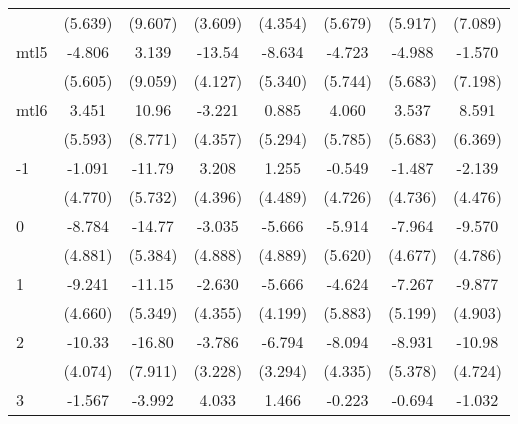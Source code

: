 \documentclass{article}
\begin{document}
{\begin{longtable}{l*{7}{c}}
                &  (5.639)         &  (9.607)         &  (3.609)         &  (4.354)         &  (5.679)         &  (5.917)         &  (7.089)         \\
mtl5            &   -4.806         &    3.139         &   -13.54\sym{**} &   -8.634         &   -4.723         &   -4.988         &   -1.570         \\
                &  (5.605)         &  (9.059)         &  (4.127)         &  (5.340)         &  (5.744)         &  (5.683)         &  (7.198)         \\
mtl6            &    3.451         &    10.96         &   -3.221         &    0.885         &    4.060         &    3.537         &    8.591         \\
                &  (5.593)         &  (8.771)         &  (4.357)         &  (5.294)         &  (5.785)         &  (5.683)         &  (6.369)         \\
-1              &   -1.091         &   -11.79\sym{*}  &    3.208         &    1.255         &   -0.549         &   -1.487         &   -2.139         \\
                &  (4.770)         &  (5.732)         &  (4.396)         &  (4.489)         &  (4.726)         &  (4.736)         &  (4.476)         \\
0               &   -8.784         &   -14.77\sym{*}  &   -3.035         &   -5.666         &   -5.914         &   -7.964         &   -9.570         \\
                &  (4.881)         &  (5.384)         &  (4.888)         &  (4.889)         &  (5.620)         &  (4.677)         &  (4.786)         \\
1               &   -9.241         &   -11.15\sym{*}  &   -2.630         &   -5.666         &   -4.624         &   -7.267         &   -9.877         \\
                &  (4.660)         &  (5.349)         &  (4.355)         &  (4.199)         &  (5.883)         &  (5.199)         &  (4.903)         \\
2               &   -10.33\sym{*}  &   -16.80\sym{*}  &   -3.786         &   -6.794\sym{*}  &   -8.094         &   -8.931         &   -10.98\sym{*}  \\
                &  (4.074)         &  (7.911)         &  (3.228)         &  (3.294)         &  (4.335)         &  (5.378)         &  (4.724)         \\
3               &   -1.567         &   -3.992         &    4.033         &    1.466         &   -0.223         &   -0.694         &   -1.032         \\

\end{longtable}}
\end{document}

